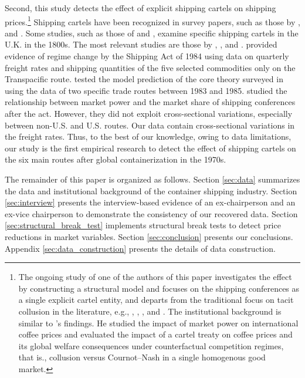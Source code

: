 \documentclass[11pt]{article}
\begin{document}
Second, this study detects the effect of explicit shipping cartels on shipping prices.\footnote{%
The ongoing study of one of the authors of this paper investigates the effect by constructing a structural model and focuses on the shipping conferences as a single explicit cartel entity, and departs from the traditional focus on tacit collusion in the literature, e.g., \cite{porter1983study}, \cite{bresnahan1987competition}, \cite{miller2017understanding}, and \cite{byrne2019learning}.
The institutional background is similar to \cite{igami2015market}'s findings. He studied the impact of market power on international coffee prices and evaluated the impact of a cartel treaty on coffee prices and its global welfare consequences under counterfactual competition regimes, that is., collusion versus Cournot–Nash in a single homogenous good market.} Shipping cartels have been recognized in survey papers, such as those by  \cite{levenstein2006determines}, and \cite{asker2021}. Some studies, such as those of \cite{morton1997entry} and \cite{podolny1999social}, examine specific shipping cartels in the U.K. in the 1800s. The most relevant studies are those by  \cite{wilson1991some}, \cite{pirrong1992application}, and \cite{clyde1998market}. \cite{wilson1991some} provided evidence of regime change by the Shipping Act of 1984 using data on quarterly freight rates and shipping quantities of the five selected commodities only on the Transpacific route.  \cite{pirrong1992application} tested the model prediction of the core theory surveyed in \cite{sjostrom2013competition} using the data of two specific trade routes between 1983 and 1985. \cite{clyde1998market} studied the relationship between market power and the market share of shipping conferences after the act. However, they did not exploit cross-sectional variations, especially between non-U.S. and U.S. routes. Our data contain cross-sectional variations in the freight rates. Thus, to the best of our knowledge, owing to data limitations, our study is the first empirical research to detect the effect of shipping cartels on the six main routes after global containerization in the 1970s.

The remainder of this paper is organized as follows. Section \ref{sec:data} summarizes the data and institutional background of the container shipping industry. Section \ref{sec:interview} presents the interview-based evidence of an ex-chairperson and an ex-vice chairperson to demonstrate the consistency of our recovered data. Section \ref{sec:structural_break_test} implements structural break tests to detect price reductions in market variables. Section \ref{sec:conclusion} presents our conclusions. Appendix \ref{sec:data_construction} presents the details of data construction.
\end{document}
